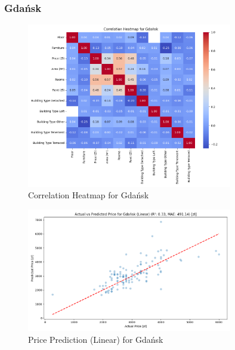 \subsubsection{Gdańsk}
\begin{figure}[H]
    \centering
    \includegraphics[width=0.8\textwidth]{figures/gdansk_correlation_heatmap.png}
    \caption{Correlation Heatmap for Gdańsk}
\end{figure}
\begin{figure}[H]
    \centering
    \includegraphics[width=0.8\textwidth]{figures/gdansk_price_prediction_linear.png}
    \caption{Price Prediction (Linear) for Gdańsk}
\end{figure}

